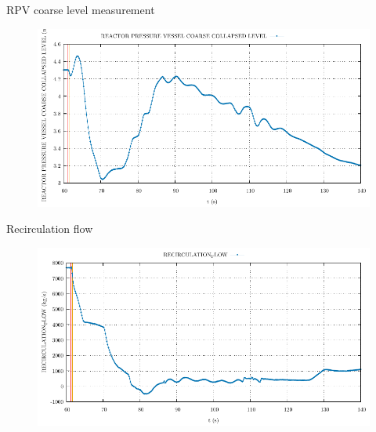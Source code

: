 \begin{frame}{RPV coarse level measurement}
	\begin{figure}
		\centering
		\includegraphics[width=\textwidth]{./02SteamLineBreak/graphs/REACTOR PRESSURE VESSEL COARSE COLLAPSED LEVEL.pdf}
		
	\end{figure}
	
\end{frame}

\begin{frame}{Recirculation flow}
	\begin{figure}
		\centering
		\includegraphics[width=\textwidth]{./02SteamLineBreak/graphs/RECIRCULATION_FLOW.pdf}
		
	\end{figure}
	
\end{frame}

